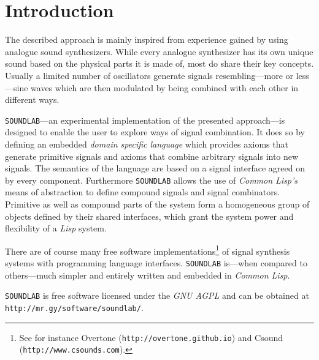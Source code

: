 \section{Introduction}

The described approach is mainly inspired from experience gained by using
analogue sound synthesizers. While every analogue synthesizer has its own
unique sound based on the physical parts it is made of, most do share
their key concepts. Usually a limited number of oscillators generate
signals resembling---more or less---sine waves which are then modulated
by being combined with each other in different ways.

\texttt{SOUNDLAB}---an experimental implementation of the presented
approach---is designed to enable the user to explore ways of signal
combination. It does so by defining an embedded \textit{domain specific
language} which provides axioms that generate primitive signals and
axioms that combine arbitrary signals into new signals. The semantics of
the language are based on a signal interface agreed on by every
component. Furthermore \texttt{SOUNDLAB} allows the use of
\textit{Common Lisp's} means of abstraction to define compound signals
and signal combinators. Primitive as well as compound parts of the system
form a homogeneous group of objects defined by their shared interfaces,
which grant the system power and flexibility of a \textit{Lisp} system.

There are of course many free software implementations\footnote{See for
instance Overtone (\texttt{http://overtone.github.io}) and Csound
(\texttt{http://www.csounds.com}).} of signal synthesis systems with
programming language interfaces. \texttt{SOUNDLAB} is---when compared to
others---much simpler and entirely written and embedded in \textit{Common
Lisp}.

\texttt{SOUNDLAB} is free software licensed under the \textit{GNU AGPL}
and can be obtained at \texttt{http://mr.gy/software/soundlab/}.
